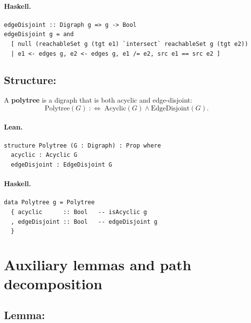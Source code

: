 \documentclass[11pt,a4paper]{article}
\begin{document}
\paragraph{Haskell.}
\begin{lstlisting}[style=haskell]
edgeDisjoint :: Digraph g => g -> Bool
edgeDisjoint g = and
  [ null (reachableSet g (tgt e1) `intersect` reachableSet g (tgt e2))
  | e1 <- edges g, e2 <- edges g, e1 /= e2, src e1 == src e2 ]
\end{lstlisting}


\subsection{Structure: }

\begin{defn}[Polytree]
A \textbf{polytree} is a digraph that is both acyclic and edge-disjoint:
\[
  \mathrm{Polytree}(G) \;:\!\iff\; \mathrm{Acyclic}(G) \wedge \mathrm{EdgeDisjoint}(G).
\]
\end{defn}

\paragraph{Lean.}
\begin{lstlisting}[style=lean]
structure Polytree (G : Digraph) : Prop where
  acyclic : Acyclic G
  edgeDisjoint : EdgeDisjoint G
\end{lstlisting}

\paragraph{Haskell.}
\begin{lstlisting}[style=haskell]
data Polytree g = Polytree
  { acyclic      :: Bool   -- isAcyclic g
  , edgeDisjoint :: Bool   -- edgeDisjoint g
  }
\end{lstlisting}


\section{Auxiliary lemmas and path decomposition}

\subsection{Lemma: }
\end{document}
